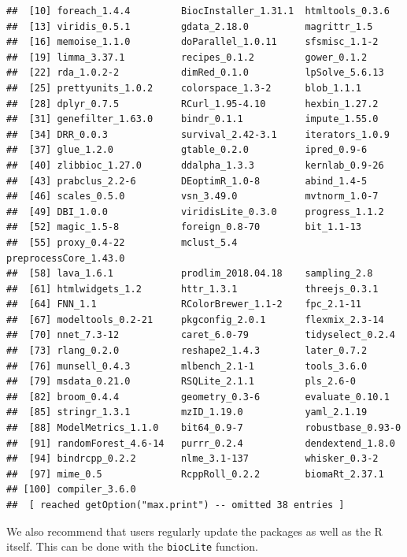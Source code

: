\begin{knitrout}
\begin{kframe}
\begin{verbatim}
##  [10] foreach_1.4.4         BiocInstaller_1.31.1  htmltools_0.3.6      
##  [13] viridis_0.5.1         gdata_2.18.0          magrittr_1.5         
##  [16] memoise_1.1.0         doParallel_1.0.11     sfsmisc_1.1-2        
##  [19] limma_3.37.1          recipes_0.1.2         gower_0.1.2          
##  [22] rda_1.0.2-2           dimRed_0.1.0          lpSolve_5.6.13       
##  [25] prettyunits_1.0.2     colorspace_1.3-2      blob_1.1.1           
##  [28] dplyr_0.7.5           RCurl_1.95-4.10       hexbin_1.27.2        
##  [31] genefilter_1.63.0     bindr_0.1.1           impute_1.55.0        
##  [34] DRR_0.0.3             survival_2.42-3.1     iterators_1.0.9      
##  [37] glue_1.2.0            gtable_0.2.0          ipred_0.9-6          
##  [40] zlibbioc_1.27.0       ddalpha_1.3.3         kernlab_0.9-26       
##  [43] prabclus_2.2-6        DEoptimR_1.0-8        abind_1.4-5          
##  [46] scales_0.5.0          vsn_3.49.0            mvtnorm_1.0-7        
##  [49] DBI_1.0.0             viridisLite_0.3.0     progress_1.1.2       
##  [52] magic_1.5-8           foreign_0.8-70        bit_1.1-13           
##  [55] proxy_0.4-22          mclust_5.4            preprocessCore_1.43.0
##  [58] lava_1.6.1            prodlim_2018.04.18    sampling_2.8         
##  [61] htmlwidgets_1.2       httr_1.3.1            threejs_0.3.1        
##  [64] FNN_1.1               RColorBrewer_1.1-2    fpc_2.1-11           
##  [67] modeltools_0.2-21     pkgconfig_2.0.1       flexmix_2.3-14       
##  [70] nnet_7.3-12           caret_6.0-79          tidyselect_0.2.4     
##  [73] rlang_0.2.0           reshape2_1.4.3        later_0.7.2          
##  [76] munsell_0.4.3         mlbench_2.1-1         tools_3.6.0          
##  [79] msdata_0.21.0         RSQLite_2.1.1         pls_2.6-0            
##  [82] broom_0.4.4           geometry_0.3-6        evaluate_0.10.1      
##  [85] stringr_1.3.1         mzID_1.19.0           yaml_2.1.19          
##  [88] ModelMetrics_1.1.0    bit64_0.9-7           robustbase_0.93-0    
##  [91] randomForest_4.6-14   purrr_0.2.4           dendextend_1.8.0     
##  [94] bindrcpp_0.2.2        nlme_3.1-137          whisker_0.3-2        
##  [97] mime_0.5              RcppRoll_0.2.2        biomaRt_2.37.1       
## [100] compiler_3.6.0       
##  [ reached getOption("max.print") -- omitted 38 entries ]
\end{verbatim}
\end{kframe}
\end{knitrout}

We also recommend that users regularly update the packages as well as
the R itself. This can be done with the \texttt{biocLite} function.

